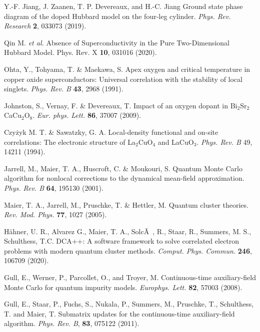 \documentclass[fleqn,twocolumn,11pt]{wlscirep}
\begin{document}
\begin{thebibliography}{99}
 Y.-F. Jiang, J. Zaanen, T. P. Devereaux, and H.-C. Jiang Ground state phase diagram of the doped Hubbard model on the four-leg cylinder. \textit{Phys. Rev. Research} {\bf 2}, 033073  (2019). 

 Qin M. {\it et al.} Absence of Superconductivity in the Pure Two-Dimensional Hubbard Model. Phys. Rev. X {\bf 10}, 031016 (2020). 







 Ohta, Y., Tohyama, T. \& Maekawa, S. Apex oxygen and critical temperature in copper oxide superconductors: Universal correlation with the stability of local singlets. \textit{ Phys. Rev. B} {\bf 43}, 2968 (1991).

 Johnston, S.,  Vernay, F. \&  Devereaux, T. Impact of an oxygen dopant in Bi$_2$Sr$_2$CaCu$_2$O$_8$. \textit{Eur. phys. Lett.} {\bf 86}, 37007 (2009).

 Czy\.{z}yk M. T. \&  Sawatzky, G. A. Local-density functional and on-site correlations: The electronic structure of La$_2$CuO$_4$ and LaCuO$_3$. \textit{Phys. Rev. B} 49, 14211 (1994).

 Jarrell, M., Maier, T. A., Huscroft, C. \& Moukouri, S. Quantum Monte Carlo algorithm for nonlocal corrections to the dynamical mean-field approximation. \textit{Phys. Rev. B} {\bf 64}, 195130 (2001).

 Maier, T. A., Jarrell, M., Pruschke, T. \&  Hettler, M. Quantum cluster theories. \textit{Rev. Mod. Phys.} {\bf 77}, 1027 (2005).

 H\"{a}hner, U. R., Alvarez G., Maier, T. A., SolcÃ , R., Staar, R., Summers, M. S., Schulthess, T.C. DCA++: A software framework to solve correlated electron problems with modern quantum cluster methods. \textit{Comput. Phys. Commun.} {\bf 246}, 106709 (2020).

 Gull, E., Werner, P., Parcollet, O., and Troyer, M. Continuous-time auxiliary-field Monte Carlo for quantum impurity models. \textit{Europhys. Lett.} {\bf 82}, 57003 (2008).

 Gull, E., Staar, P., Fuchs, S., Nukala, P., Summers, M., Pruschke, T., Schulthess, T. and Maier, T. Submatrix updates for the continuous-time auxiliary-field algorithm. \textit{Phys. Rev. B}, {\bf 83}, 075122 (2011).


\end{thebibliography}

\end{document}
